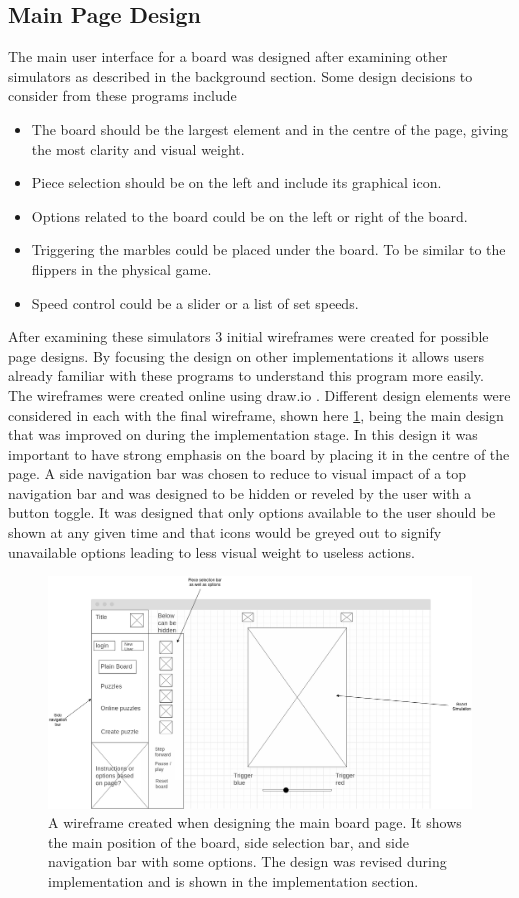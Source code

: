 \documentclass{l4proj}
\begin{document}
\subsection{Main Page Design}
The main user interface for a board was designed after examining other simulators as described in the background section. Some design decisions to consider from these programs include
\begin{itemize}
    \item The board should be the largest element and in the centre of the page, giving the most clarity and visual weight.
    \item Piece selection should be on the left and include its graphical icon.
    \item Options related to the board could be on the left or right of the board.
    \item Triggering the marbles could be placed under the board. To be similar to the flippers in the physical game.
    \item Speed control could be a slider or a list of set speeds.
\end{itemize}

After examining these simulators 3 initial wireframes were created for possible page designs. By focusing the design on other implementations it allows users already familiar with these programs to understand this program more easily. The wireframes were created online using draw.io \citep{noauthor_flowchart_nodate}. Different design elements were considered in each with the final wireframe, shown here \ref{fig:wireframe}, being the main design that was improved on during the implementation stage. In this design it was important to have strong emphasis on the board by placing it in the centre of the page. A side navigation bar was chosen to reduce to visual impact of a top navigation bar and was designed to be hidden or reveled by the user with a button toggle. It was designed that only options available to the user should be shown at any given time and that icons would be greyed out to signify unavailable options leading to less visual weight to useless actions.


\begin{figure}
    \centering
    \includegraphics[width=0.8\linewidth]{images/wireframe.png}
    \caption{A wireframe created when designing the main board page. It shows the main position of the board, side selection bar, and side navigation bar with some options. The design was revised during implementation and is shown in the implementation section.}
    \label{fig:wireframe}
\end{figure}
\end{document}
